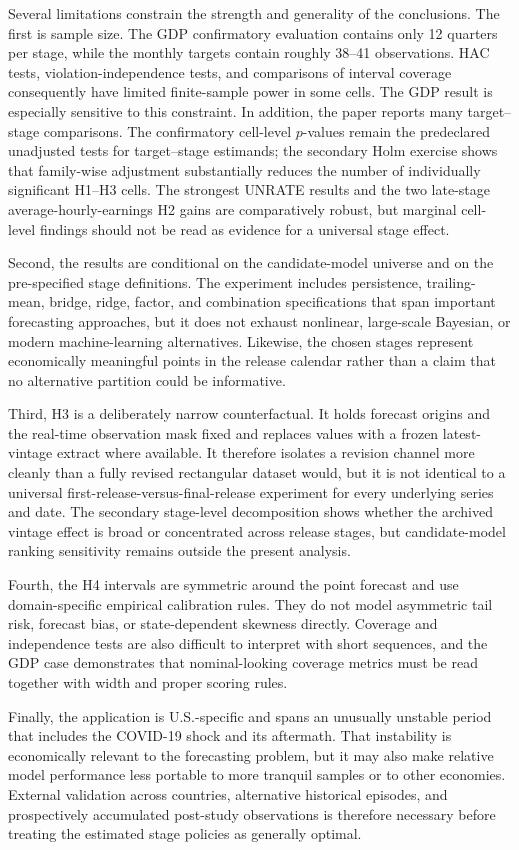 Several limitations constrain the strength and generality of the conclusions.
The first is sample size.  The GDP confirmatory evaluation contains only 12
quarters per stage, while the monthly targets contain roughly 38--41
observations.  HAC tests, violation-independence tests, and comparisons of
interval coverage consequently have limited finite-sample power in some cells.
The GDP result is especially sensitive to this constraint.  In addition, the
paper reports many target--stage comparisons. The confirmatory cell-level
\(p\)-values remain the predeclared unadjusted tests for target--stage
estimands; the secondary Holm exercise shows that family-wise adjustment
substantially reduces the number of individually significant H1--H3 cells.
The strongest UNRATE results and the two late-stage average-hourly-earnings H2
gains are comparatively robust, but marginal cell-level findings should not be
read as evidence for a universal stage effect.

Second, the results are conditional on the candidate-model universe and on the
pre-specified stage definitions.  The experiment includes persistence,
trailing-mean, bridge, ridge, factor, and combination specifications that span
important forecasting approaches, but it does not exhaust nonlinear,
large-scale Bayesian, or modern machine-learning alternatives.  Likewise, the
chosen stages represent economically meaningful points in the release calendar
rather than a claim that no alternative partition could be informative.

Third, H3 is a deliberately narrow counterfactual.  It holds forecast origins
and the real-time observation mask fixed and replaces values with a frozen
latest-vintage extract where available.  It therefore isolates a revision
channel more cleanly than a fully revised rectangular dataset would, but it is
not identical to a universal first-release-versus-final-release experiment for
every underlying series and date.  The secondary stage-level decomposition
shows whether the archived vintage effect is broad or concentrated across
release stages, but candidate-model ranking sensitivity remains outside the
present analysis.

Fourth, the H4 intervals are symmetric around the point forecast and use
domain-specific empirical calibration rules.  They do not model asymmetric
tail risk, forecast bias, or state-dependent skewness directly.  Coverage and
independence tests are also difficult to interpret with short sequences, and
the GDP case demonstrates that nominal-looking coverage metrics must be read
together with width and proper scoring rules.

Finally, the application is U.S.-specific and spans an unusually unstable
period that includes the COVID-19 shock and its aftermath.  That instability
is economically relevant to the forecasting problem, but it may also make
relative model performance less portable to more tranquil samples or to other
economies.  External validation across countries, alternative historical
episodes, and prospectively accumulated post-study observations is therefore
necessary before treating the estimated stage policies as generally optimal.
